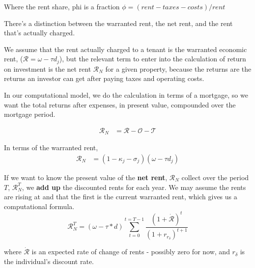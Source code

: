 Where the \gls{rent share}, phi is a fraction
$\phi = (rent-taxes-costs) /rent$ 

There's a distinction between the warranted rent, the net rent, and the rent that's actually charged.

We assume that the  rent  actually charged to a tenant is the warranted economic rent, ($\mathcal{R}= \omega - \tau d_j$), but the relevant term to enter into the calculation of return on investment is the net rent $\mathcal{R}_N$ for a given property, because the returns are the returns an investor can get after paying taxes and operating costs.

In our computational model, we do the calculation in terms of a mortgage, so we want the total returns after expenses, in present value, compounded over the mortgage  period.

\begin{align}
\mathcal{R}_N &= \mathcal{R} - \mathcal{O} - \mathcal{T} 
\end{align}

In terms of the warranted rent, 
\begin{align}
\mathcal{R}_N &= (1-\kappa_j - \sigma_j)(\omega - \tau d_j)
\end{align}




If we want to know the  present value  of the \textbf{net rent}, $\mathcal{R}_N$  collect over the period  $T$, $\mathcal{R}_N^T$, we \textbf{add up} the discounted rents for each year. We may assume the rents are rising at and that the first is the current warranted rent, which gives us a computational formula. 
\[\mathcal{R}_N^T= (\omega-\tau*d)\sum_{t=0}^{t=T-1} \frac{(1+\dot{\mathcal{R}})^{t}} {(1+r_{r_\delta})^{t+1}} \]

\noindent where $\dot{\mathcal{R}}$ is an expected rate of change of rents - possibly zero for now, and $r_\delta$ is the individual's discount rate. 

